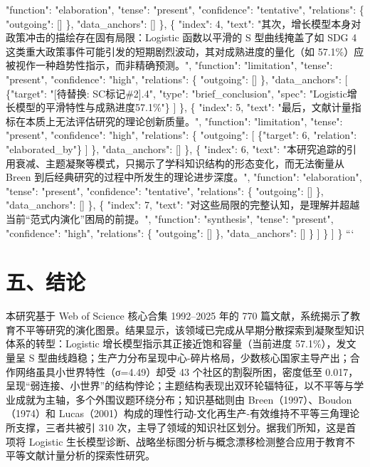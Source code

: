 \documentclass[12pt,a4paper]{article}
\begin{document}
          "function": "elaboration",
          "tense": "present",
          "confidence": "tentative",
          "relations": \{
            "outgoing": []
          \},
          "data\_anchors": []
        \},
        \{
          "index": 4,
          "text": "其次，增长模型本身对政策冲击的描绘存在固有局限：Logistic 函数以平滑的 S 型曲线掩盖了如 SDG 4 这类重大政策事件可能引发的短期剧烈波动，其对成熟进度的量化（如 57.1\%）应被视作一种趋势性指示，而非精确预测。",
          "function": "limitation",
          "tense": "present",
          "confidence": "high",
          "relations": \{
            "outgoing": []
          \},
          "data\_anchors": [
            \{"target": "[待替换: SC标记\#2].4", "type": "brief\_conclusion", "spec": "Logistic增长模型的平滑特性与成熟进度57.1\%"\}
          ]
        \},
        \{
          "index": 5,
          "text": "最后，文献计量指标在本质上无法评估研究的理论创新质量。",
          "function": "limitation",
          "tense": "present",
          "confidence": "high",
          "relations": \{
            "outgoing": [
              \{"target": 6, "relation": "elaborated\_by"\}
            ]
          \},
          "data\_anchors": []
        \},
        \{
          "index": 6,
          "text": "本研究追踪的引用衰减、主题凝聚等模式，只揭示了学科知识结构的形态变化，而无法衡量从 Breen 到后经典研究的过程中所发生的理论进步深度。",
          "function": "elaboration",
          "tense": "present",
          "confidence": "tentative",
          "relations": \{
            "outgoing": []
          \},
          "data\_anchors": []
        \},
        \{
          "index": 7,
          "text": "对这些局限的完整认知，是理解并超越当前“范式内演化”困局的前提。",
          "function": "synthesis",
          "tense": "present",
          "confidence": "high",
          "relations": \{
            "outgoing": []
          \},
          "data\_anchors": []
        \}
      ]
    \}
  ]
\}
```

\section{五、结论}

本研究基于 Web of Science 核心合集 1992–2025 年的 770 篇文献，系统揭示了教育不平等研究的演化图景。结果显示，该领域已完成从早期分散探索到凝聚型知识体系的转型：Logistic 增长模型指示其正接近饱和容量（当前进度 57.1\%），发文量呈 S 型曲线趋稳；生产力分布呈现中心-碎片格局，少数核心国家主导产出；合作网络虽具小世界特性（σ=4.49）却受 43 个社区的割裂所困，密度低至 0.017，呈现“弱连接、小世界”的结构悖论；主题结构表现出双环轮辐特征，以不平等与学业成就为主轴，多个外围议题环绕分布；知识基础则由 Breen（1997）、Boudon（1974）和 Lucas（2001）构成的理性行动-文化再生产-有效维持不平等三角理论所支撑，三者共被引 310 次，主导了领域的知识社区划分。据我们所知，这是首项将 Logistic 生长模型诊断、战略坐标图分析与概念漂移检测整合应用于教育不平等文献计量分析的探索性研究。
\end{document}
